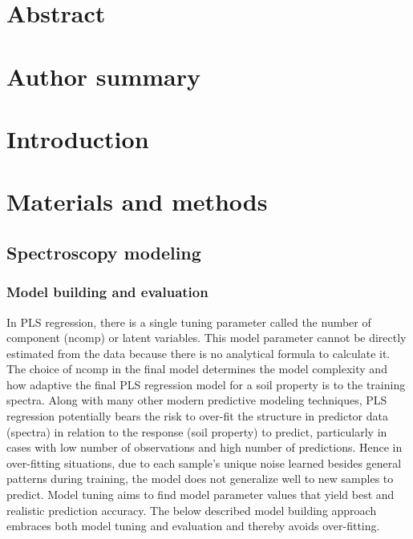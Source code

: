 \documentclass[10pt,letterpaper]{article}
\begin{document}
\section*{Abstract}


\section*{Author summary}

\linenumbers

\section*{Introduction}

\section*{Materials and methods}

\subsection*{Spectroscopy modeling}

\subsubsection*{Model building and evaluation}

In PLS regression, there is a single tuning parameter called the number of
component (ncomp) or latent variables. This model parameter cannot be
directly estimated from the data because there is no analytical formula to
calculate it. The choice of ncomp in the final model determines the model
complexity and how adaptive the final PLS regression model for a soil property
is to the training spectra. Along with many other modern predictive modeling
techniques, PLS regression potentially bears the risk to over-fit the
structure in predictor data (spectra) in relation to the response (soil
property) to predict, particularly in cases with low number of observations and
high number of predictions. Hence in over-fitting situations, due to each
sample’s unique noise learned besides general patterns during training, the
model does not generalize well to new samples to predict. Model tuning aims
to find model parameter values that yield best and realistic prediction
accuracy. The below described model building approach embraces both model
tuning and evaluation and thereby avoids over-fitting.
\end{document}
